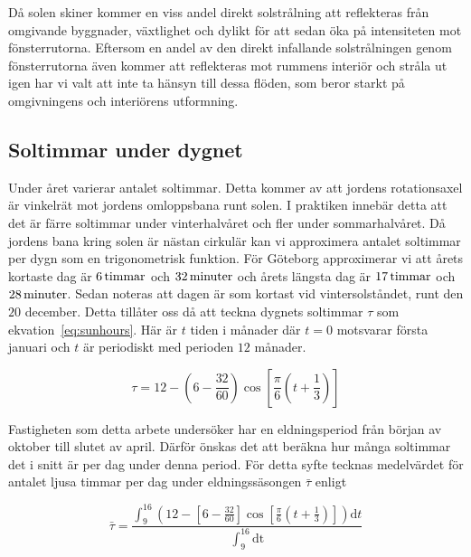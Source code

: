 Då solen skiner kommer en viss andel direkt solstrålning att reflekteras från omgivande byggnader, växtlighet och dylikt för att sedan öka på intensiteten mot fönsterrutorna. Eftersom en andel av den direkt infallande solstrålningen genom fönsterrutorna även kommer att reflekteras mot rummens interiör och stråla ut igen har vi valt att inte ta hänsyn till dessa flöden, som beror starkt på omgivningens och interiörens utformning.

\subsection{Soltimmar under dygnet}
\label{subsec:sunhours}
Under året varierar antalet soltimmar. Detta kommer av att jordens rotationsaxel är vinkelrät 
mot jordens omloppsbana runt solen. I praktiken innebär detta att det är färre soltimmar
under vinterhalvåret och fler under sommarhalvåret. Då jordens bana kring solen är nästan
cirkulär kan vi approximera antalet soltimmar per dygn som en trigonometrisk funktion.
För Göteborg approximerar vi att årets kortaste dag är $\unit[6]{ timmar}$ och $\unit[32]{minuter}$ och årets längsta
dag är $\unit[17]{ timmar}$ och $\unit[28]{ minuter}$\cite{sunup}. Sedan noteras att dagen är som kortast vid vintersolståndet, runt den $20$
december.
Detta tillåter oss då att teckna dygnets soltimmar $\tau$ som ekvation~\eqref{eq:sunhours}. Här
är $t$ tiden i månader där $t=0$ motsvarar första januari och $t$ är periodiskt med perioden $12$ månader.

\begin{equation}
\label{eq:sunhours}
\tau = 12 - \left(6-\frac{32}{60}\right)\cos\left[\frac{\pi}{6}\left(t+\frac{1}{3}\right)\right]
\end{equation}

Fastigheten som detta arbete undersöker har en eldningsperiod från början av oktober till slutet av april. Därför önskas det att beräkna hur många soltimmar det i snitt är per dag under denna period. För detta syfte tecknas medelvärdet för antalet ljusa timmar per dag under eldningssäsongen $\bar{\tau}$ enligt

\begin{equation}
\label{eq:taubar}
\bar{\tau}= \frac{ \int^{16}_9 \left(12 - \left[6-\frac{32}{60}\right]\cos\left[\frac{\pi}{6}\left(t+
\frac{1}{3}\right)\right]\right)\mathrm{d}t}{\int^{16}_9 \mathrm{dt}}
\end{equation}


